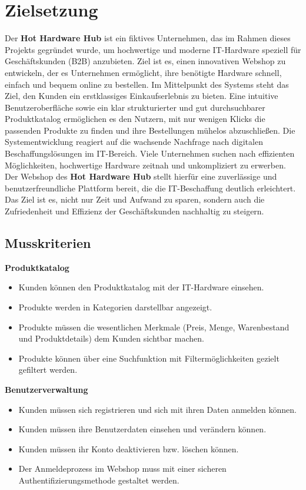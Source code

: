 \documentclass[%
	ngerman,
	12pt,
	a4paper,
	oneside,
	parskip=full
]{scrbook}
\begin{document}
\chapter{Zielsetzung}
	Der \textbf{Hot Hardware Hub} ist ein fiktives Unternehmen, das im Rahmen dieses Projekts gegründet wurde, um hochwertige und moderne IT-Hardware speziell für Geschäftskunden (B2B) anzubieten. Ziel ist es, einen innovativen Webshop zu entwickeln, der es Unternehmen ermöglicht, ihre benötigte Hardware schnell, einfach und bequem online zu bestellen.
	Im Mittelpunkt des Systems steht das Ziel, den Kunden ein erstklassiges Einkaufserlebnis zu bieten. Eine intuitive Benutzeroberfläche sowie ein klar strukturierter und gut durchsuchbarer Produktkatalog ermöglichen es den Nutzern, mit nur wenigen Klicks die passenden Produkte zu finden und ihre Bestellungen mühelos abzuschließen.
	Die Systementwicklung reagiert auf die wachsende Nachfrage nach digitalen Beschaffungslösungen im IT-Bereich. Viele Unternehmen suchen nach effizienten Möglichkeiten, hochwertige Hardware zeitnah und unkompliziert zu erwerben. Der Webshop des \textbf{Hot Hardware Hub} stellt hierfür eine zuverlässige und benutzerfreundliche Plattform bereit, die die IT-Beschaffung deutlich erleichtert. Das Ziel ist es, nicht nur Zeit und Aufwand zu sparen, sondern auch die Zufriedenheit und Effizienz der Geschäftskunden nachhaltig zu steigern.

\section{Musskriterien}
	\vspace{0.5cm}
	\textbf{Produktkatalog}
	\begin{itemize}
		\item Kunden können den Produktkatalog mit der IT-Hardware einsehen.
		\item Produkte werden in Kategorien darstellbar angezeigt.
		\item Produkte müssen die wesentlichen Merkmale (Preis, Menge, Warenbestand und Produktdetails) dem Kunden sichtbar machen.
		\item Produkte können über eine Suchfunktion mit Filtermöglichkeiten gezielt gefiltert werden.
	\end{itemize}

	\vspace{0.5cm}
	\textbf{Benutzerverwaltung}
	\begin{itemize}
		\item Kunden müssen sich registrieren und sich mit ihren Daten anmelden können.
		\item Kunden müssen ihre Benutzerdaten einsehen und verändern können.
		\item Kunden müssen ihr Konto deaktivieren bzw. löschen können.
		\item Der Anmeldeprozess im Webshop muss mit einer sicheren Authentifizierungsmethode gestaltet werden.
	\end{itemize}
\end{document}
